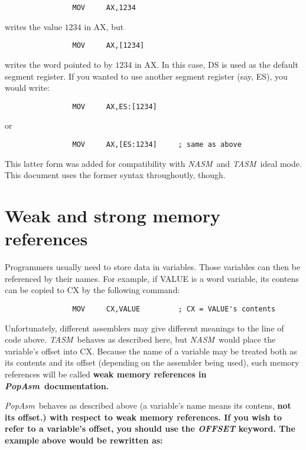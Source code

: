 \documentclass[a4paper,12pt]{book}
\newcommand{\popasm}{\emph{PopAsm}}
\newcommand{\nasm}{\emph{NASM}}
\newcommand{\tasm}{\emph{TASM}}
\begin{document}
\begin{verbatim}
                MOV     AX,1234
\end{verbatim}

\noindent writes the value $1234$ in AX, but

\begin{verbatim}
                MOV     AX,[1234]
\end{verbatim}

\noindent writes the word pointed to by $1234$ in AX. In this case, DS is used as the
default segment register. If you wanted to use another segment register (say,
ES), you would write:

\begin{verbatim}
                MOV     AX,ES:[1234]
\end{verbatim}

\noindent or

\begin{verbatim}
                MOV     AX,[ES:1234]     ; same as above
\end{verbatim}

This latter form was added for compatibility with \nasm\ and \tasm\ ideal mode.
This document uses the former syntax throughoutly, though.

\section{Weak and strong memory references}
Programmers usually need to store data in variables. Those variables can then
be referenced by their names. For example, if VALUE is a word variable, its
contens can be copied to CX by the following command:

\begin{verbatim}
                MOV     CX,VALUE         ; CX = VALUE's contents
\end{verbatim}

Unfortunately, different assemblers may give different meanings to the line
of code above. \tasm\ behaves as described here, but \nasm\ would place the
variable's offset into CX. Because the name of a variable may be treated both
as its contents and its offset (depending on the assembler being used), such
memory references will be called \bf{weak memory references} in \popasm\ 
documentation.

\popasm\ behaves as described above (a variable's name means its contens, \bf{not}
its offset.) with respect to weak memory references. If you wish to refer to
a variable's offset, you should use the \emph{OFFSET} keyword. The example
above would be rewritten as:
\end{document}
